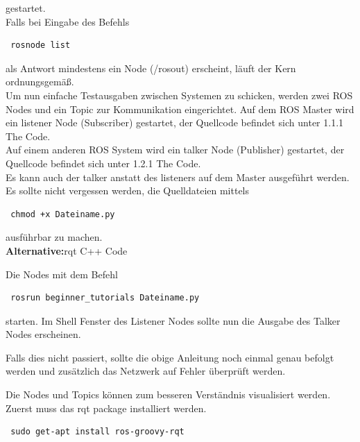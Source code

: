 \documentclass[12pt]{article}
\begin{document}
gestartet. \\
Falls bei Eingabe des Befehls

 \begin{lstlisting}
 rosnode list
 \end{lstlisting}

als Antwort mindestens ein Node (/rosout) erscheint, läuft der Kern ordnungsgemäß. \\
Um nun einfache Testausgaben zwischen Systemen zu schicken, werden zwei ROS Nodes und ein Topic zur Kommunikation eingerichtet.
Auf dem ROS Master wird ein listener Node (Subscriber) gestartet, der Quellcode befindet sich unter 1.1.1 The Code. \\
Auf einem anderen ROS System wird ein talker Node (Publisher) gestartet, der Quellcode befindet sich unter 1.2.1 The Code. \\
Es kann auch der talker anstatt des listeners auf dem Master ausgeführt werden.
Es sollte nicht vergessen werden, die Quelldateien mittels

 \begin{lstlisting}
 chmod +x Dateiname.py
 \end{lstlisting}

ausführbar zu machen. \\
{\bf Alternative:}rqt C++ Code

Die Nodes mit dem Befehl 

 \begin{lstlisting}
 rosrun beginner_tutorials Dateiname.py
 \end{lstlisting}
 
starten.
Im Shell Fenster des Listener Nodes sollte nun die Ausgabe des Talker Nodes erscheinen.

Falls dies nicht passiert, sollte die obige Anleitung noch einmal genau befolgt werden und zusätzlich das Netzwerk auf Fehler überprüft werden.

Die Nodes und Topics können zum besseren Verständnis visualisiert werden.
Zuerst muss das rqt package installiert werden.

 \begin{lstlisting}
 sudo get-apt install ros-groovy-rqt
 \end{lstlisting}
\end{document}
